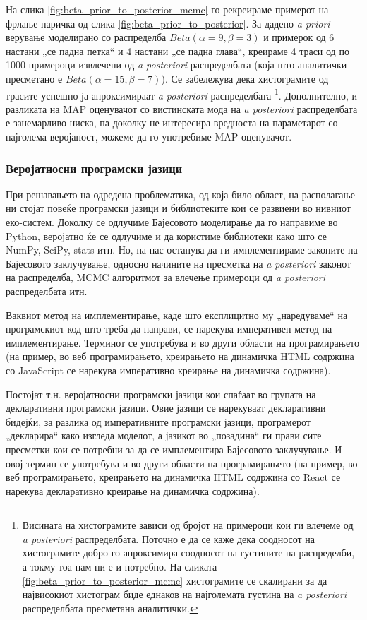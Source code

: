 \documentclass[12pt]{article}
\numberwithin{equation}{section}
\begin{document}
На слика \ref{fig:beta_prior_to_posterior_mcmc} го рекреираме примерот на фрлање паричка од слика \ref{fig:beta_prior_to_posterior}. За дадено \textit{a priori} верување моделирано со распределба \(Beta(\alpha=9, \beta=3)\) и примерок од 6 настани „се падна петка“ и 4 настани „се падна глава“, креираме 4 траси од по 1000 примероци извлечени од \textit{a posteriori} распределбата (која што аналитички пресметано е \(Beta(\alpha=15, \beta=7)\)). Се забележува дека хистограмите од трасите успешно ја апроксимираат \textit{a posteriori} распределбата \footnote{Висината на хистограмите зависи од бројот на примероци кои ги влечеме од \textit{a posteriori} распределбата. Поточно е да се каже дека соодносот на хистограмите добро го апроксимира соодносот на густините на распределби, а токму тоа нам ни е и потребно. На сликата \ref{fig:beta_prior_to_posterior_mcmc} хистограмите се скалирани за да највисокиот хистограм биде еднаков на најголемата густина на \textit{a posteriori} распределбата пресметана аналитички.}. Дополнително, и разликата на MAP оценувачот со вистинската мода на \textit{a posteriori} распределбата е занемарливо ниска, па доколку не интересира вредноста на параметарот со најголема веројаност, можеме да го употребиме MAP оценувачот.

\subsubsection{Веројатносни програмски јазици}

При решавањето на одредена проблематика, од која било област, на располагање ни стојат повеќе програмски јазици и библиотеките кои се развиени во нивниот еко-систем. Доколку се одлучиме Бајесовото моделирање да го направиме во Python, веројатно ќе се одлучиме и да користиме библиотеки како што се NumPy, SciPy, stats итн. Но, на нас останува да ги имплементираме законите на Бајесовото заклучување, односно начините на пресметка на \textit{a posteriori} законот на распределба, MCMC алгоритмот за влечење примероци од \textit{a posteriori} распределбата итн.

Ваквиот метод на имплементирање, каде што експлицитно му „наредуваме“ на програмскиот код што треба да направи, се нарекува императивен метод на имплементирање. Терминот се употребува и во други области на програмирањето (на пример, во веб програмирањето, креирањето на динамичка HTML содржина со JavaScript се нарекува императивно креирање на динамичка содржина).

Постојат т.н. веројатносни програмски јазици кои спаѓаат во групата на декларативни програмски јазици. Овие јазици се нарекуваат декларативни бидејќи, за разлика од императивните програмски јазици, програмерот „декларира“ како изгледа моделот, а јазикот во „позадина“ ги прави сите пресметки кои се потребни за да се имплементира Бајесовото заклучување. И овој термин се употребува и во други области на програмирањето (на пример, во веб програмирањето, креирањето на динамичка HTML содржина со React се нарекува декларативно креирање на динамичка содржина).
\end{document}
